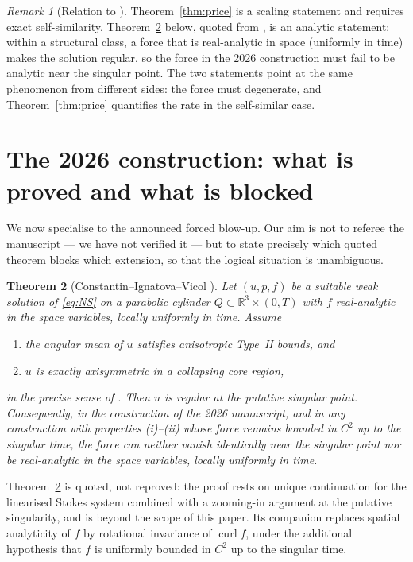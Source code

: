 \documentclass[11pt]{article}
\newtheorem{theorem}{Theorem}[section]
\theoremstyle{remark}
\newtheorem{remark}[theorem]{Remark}
\newcommand{\R}{\mathbb{R}}
\newcommand{\curl}{\operatorname{curl}}
\begin{document}
\begin{remark}[Relation to \cite{CIV2026}]\label{rem:CIVrelation}
Theorem~\ref{thm:price} is a scaling statement and requires exact self-similarity.
Theorem~\ref{thm:CIV} below, quoted from \cite{CIV2026}, is an analytic statement: within a structural
class, a force that is real-analytic in space (uniformly in time) makes the solution regular,
so the force in the 2026 construction must fail to be analytic near the singular point. The
two statements point at the same phenomenon from different sides: the force must degenerate,
and Theorem~\ref{thm:price} quantifies the rate in the self-similar case.
\end{remark}

\section{The 2026 construction: what is proved and what is blocked}\label{sec:2026}

We now specialise to the announced forced blow-up. Our aim is not to referee the manuscript
--- we have not verified it --- but to state precisely which quoted theorem blocks which
extension, so that the logical situation is unambiguous.

\begin{theorem}[Constantin--Ignatova--Vicol {\rm\cite{CIV2026}}]\label{thm:CIV}
Let $(u,p,f)$ be a suitable weak solution of \eqref{eq:NS} on a parabolic cylinder
$Q\subset\R^3\times(0,T)$ with $f$ real-analytic in the space variables, locally uniformly in
time. Assume
\begin{enumerate}[label=(\roman*),leftmargin=*]
\item the angular mean of $u$ satisfies anisotropic Type~II bounds, and
\item $u$ is exactly axisymmetric in a collapsing core region,
\end{enumerate}
in the precise sense of \cite{CIV2026}. Then $u$ is regular at the putative singular point.
Consequently, in the construction of the 2026 manuscript, and in any construction with
properties (i)--(ii) whose force remains bounded in $C^2$ up to the singular time, the force
can neither vanish identically near the singular point nor be real-analytic in the space
variables, locally uniformly in time.
\end{theorem}

Theorem~\ref{thm:CIV} is quoted, not reproved: the proof rests on unique continuation for the
linearised Stokes system combined with a zooming-in argument at the putative singularity, and
is beyond the scope of this paper. Its companion \cite{IKX2026} replaces spatial analyticity
of $f$ by rotational invariance of $\curl f$, under the additional hypothesis that $f$ is
uniformly bounded in $C^2$ up to the singular time.
\end{document}
